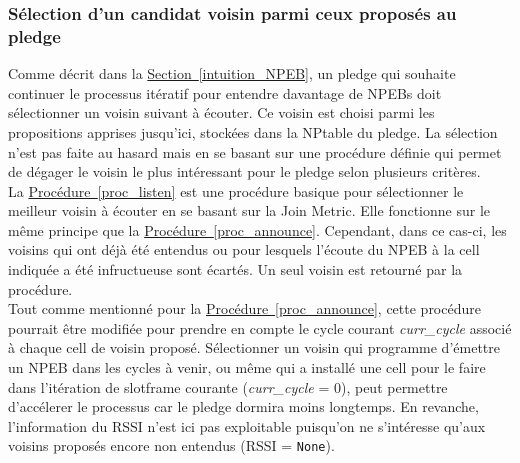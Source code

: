 \documentclass[]{report}
\newcommand{\wordlink}[2]{\hyperref[#2]{#1~\ref{#2}}}
\begin{document}
\vspace{0.2cm}

\subsubsection{Sélection d'un candidat voisin parmi ceux proposés au pledge}

Comme décrit dans la \wordlink{Section}{intuition_NPEB}, un pledge qui souhaite continuer le processus itératif pour entendre davantage de NPEBs doit sélectionner un voisin suivant à écouter. Ce voisin est choisi parmi les propositions apprises jusqu'ici, stockées dans la NPtable du pledge. La sélection n'est pas faite au hasard mais en se basant sur une procédure  définie qui permet de dégager le voisin le plus intéressant pour le pledge selon plusieurs critères.\\

La \wordlink{Procédure}{proc_listen} est une procédure basique pour sélectionner le meilleur voisin à écouter en se basant sur la Join Metric. Elle fonctionne sur le même principe que la \wordlink{Procédure}{proc_announce}. Cependant, dans ce cas-ci, les voisins qui ont déjà été entendus ou pour lesquels l'écoute du NPEB à la cell indiquée a été infructueuse sont écartés. Un seul voisin est retourné par la procédure.\\

Tout comme mentionné pour la \wordlink{Procédure}{proc_announce}, cette procédure pourrait être modifiée pour prendre en compte le cycle courant \textit{curr\_cycle} associé à chaque cell de voisin proposé. Sélectionner un voisin qui programme d'émettre un NPEB dans les cycles à venir, ou même qui a installé une cell pour le faire dans l'itération de slotframe courante (\textit{curr\_cycle} = 0), peut permettre d'accélerer le processus car le pledge dormira moins longtemps. En revanche, l'information du RSSI n'est ici pas exploitable puisqu'on ne s'intéresse qu'aux voisins proposés encore non entendus (RSSI = \texttt{None}).

\newpage
\end{document}
